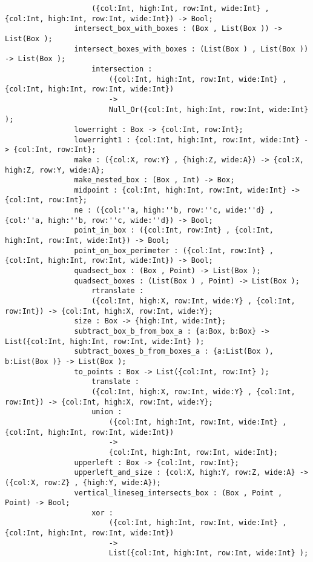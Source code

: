 \begin{verbatim}
                    ({col:Int, high:Int, row:Int, wide:Int} , {col:Int, high:Int, row:Int, wide:Int}) -> Bool;
                intersect_box_with_boxes : (Box , List(Box )) -> List(Box );
                intersect_boxes_with_boxes : (List(Box ) , List(Box )) -> List(Box );
                    intersection :
                        ({col:Int, high:Int, row:Int, wide:Int} , {col:Int, high:Int, row:Int, wide:Int})
                        ->
                        Null_Or({col:Int, high:Int, row:Int, wide:Int} );
                lowerright : Box -> {col:Int, row:Int};
                lowerright1 : {col:Int, high:Int, row:Int, wide:Int} -> {col:Int, row:Int};
                make : ({col:X, row:Y} , {high:Z, wide:A}) -> {col:X, high:Z, row:Y, wide:A};
                make_nested_box : (Box , Int) -> Box;
                midpoint : {col:Int, high:Int, row:Int, wide:Int} -> {col:Int, row:Int};
                ne : ({col:''a, high:''b, row:''c, wide:''d} , {col:''a, high:''b, row:''c, wide:''d}) -> Bool;
                point_in_box : ({col:Int, row:Int} , {col:Int, high:Int, row:Int, wide:Int}) -> Bool;
                point_on_box_perimeter : ({col:Int, row:Int} , {col:Int, high:Int, row:Int, wide:Int}) -> Bool;
                quadsect_box : (Box , Point) -> List(Box );
                quadsect_boxes : (List(Box ) , Point) -> List(Box );
                    rtranslate :
                    ({col:Int, high:X, row:Int, wide:Y} , {col:Int, row:Int}) -> {col:Int, high:X, row:Int, wide:Y};
                size : Box -> {high:Int, wide:Int};
                subtract_box_b_from_box_a : {a:Box, b:Box} -> List({col:Int, high:Int, row:Int, wide:Int} );
                subtract_boxes_b_from_boxes_a : {a:List(Box ), b:List(Box )} -> List(Box );
                to_points : Box -> List({col:Int, row:Int} );
                    translate :
                    ({col:Int, high:X, row:Int, wide:Y} , {col:Int, row:Int}) -> {col:Int, high:X, row:Int, wide:Y};
                    union :
                        ({col:Int, high:Int, row:Int, wide:Int} , {col:Int, high:Int, row:Int, wide:Int})
                        ->
                        {col:Int, high:Int, row:Int, wide:Int};
                upperleft : Box -> {col:Int, row:Int};
                upperleft_and_size : {col:X, high:Y, row:Z, wide:A} -> ({col:X, row:Z} , {high:Y, wide:A});
                vertical_lineseg_intersects_box : (Box , Point , Point) -> Bool;
                    xor :
                        ({col:Int, high:Int, row:Int, wide:Int} , {col:Int, high:Int, row:Int, wide:Int})
                        ->
                        List({col:Int, high:Int, row:Int, wide:Int} );

\end{verbatim}
